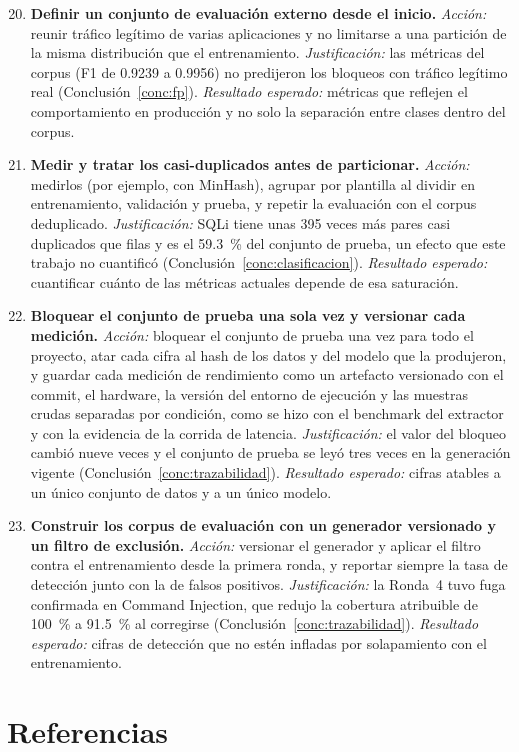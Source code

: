 \begin{enumerate}
    \setcounter{enumi}{19}
    \item \textbf{Definir un conjunto de evaluación externo desde el inicio.} \textit{Acción:}
    reunir tráfico legítimo de varias aplicaciones y no limitarse a una partición de la misma
    distribución que el entrenamiento. \textit{Justificación:} las métricas del corpus (F1 de
    0.9239 a 0.9956) no predijeron los bloqueos con tráfico legítimo real (Conclusión~\ref{conc:fp}).
    \textit{Resultado esperado:} métricas que reflejen el comportamiento en producción y no solo la
    separación entre clases dentro del corpus.

    \item \textbf{Medir y tratar los casi-duplicados antes de particionar.} \textit{Acción:}
    medirlos (por ejemplo, con MinHash), agrupar por plantilla al dividir en entrenamiento,
    validación y prueba, y repetir la evaluación con el corpus deduplicado. \textit{Justificación:}
    SQLi tiene unas 395 veces más pares casi duplicados que filas y es el 59.3~\% del conjunto de
    prueba, un efecto que este trabajo no cuantificó (Conclusión~\ref{conc:clasificacion}).
    \textit{Resultado esperado:} cuantificar cuánto de las métricas actuales depende de esa
    saturación.

    \item \textbf{Bloquear el conjunto de prueba una sola vez y versionar cada medición.}
    \textit{Acción:} bloquear el conjunto de prueba una vez para todo el proyecto, atar cada cifra
    al hash de los datos y del modelo que la produjeron, y guardar cada medición de rendimiento
    como un artefacto versionado con el commit, el hardware, la versión del entorno de ejecución y
    las muestras crudas separadas por condición, como se hizo con el benchmark del extractor y con
    la evidencia de la corrida de latencia. \textit{Justificación:} el valor del bloqueo cambió
    nueve veces y el conjunto de prueba se leyó tres veces en la generación vigente
    (Conclusión~\ref{conc:trazabilidad}). \textit{Resultado esperado:} cifras atables a un único
    conjunto de datos y a un único modelo.

    \item \textbf{Construir los corpus de evaluación con un generador versionado y un filtro de
    exclusión.} \textit{Acción:} versionar el generador y aplicar el filtro contra el
    entrenamiento desde la primera ronda, y reportar siempre la tasa de detección junto con la de
    falsos positivos. \textit{Justificación:} la Ronda~4 tuvo fuga confirmada en Command Injection,
    que redujo la cobertura atribuible de 100~\% a 91.5~\% al corregirse
    (Conclusión~\ref{conc:trazabilidad}). \textit{Resultado esperado:} cifras de detección que no
    estén infladas por solapamiento con el entrenamiento.
\end{enumerate}

\ifdefined\modoensamble
\else
	\section*{Referencias}
	\printbibliography[heading=none]
	
\fi
